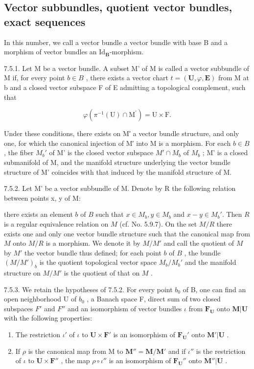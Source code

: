 \subsection{Vector subbundles, quotient vector bundles, exact sequences}

In this number, we call a vector bundle a vector bundle with base B and a morphism of vector bundles an \(\mathrm{Id}_{\mathbf{B}}\)-morphism.

7.5.1. Let M be a vector bundle. A subset M' of M is called a vector subbundle of M if, for every point \(b \in B\) , there exists a vector chart \(t = (\mathbf{U}, \varphi, \mathbf{E})\) from M at b and a closed vector subspace F of E admitting a topological complement, such that

\[
\varphi (\pi^ {- 1} (\mathrm{U}) \cap \mathrm{M} ^ {\prime}) = \mathrm{U} \times \mathrm{F}.
\]

Under these conditions, there exists on M′ a vector bundle structure, and only one, for which the canonical injection of M′ into M is a morphism. For each \(b \in B\) , the fiber \(M_{b}'\) of M' is the closed vector subspace \(M' \cap M_{b}\) of \(M_{b}\) ; M' is a closed submanifold of M, and the manifold structure underlying the vector bundle structure of M' coincides with that induced by the manifold structure of M.

7.5.2. Let M' be a vector subbundle of M. Denote by R the following relation between points x, y of M:

there exists an element \(b\) of \(B\) such that \(x \in M_b, y \in M_b\) and \(x - y \in M_b'\). Then \(R\) is a regular equivalence relation on \(M\) (cf. No. 5.9.7). On the set \(M/R\) there exists one and only one vector bundle structure such that the canonical map from \(M\) onto \(M/R\) is a morphism. We denote it by \(M/M'\) and call the quotient of \(M\) by \(M'\) the vector bundle thus defined; for each point \(b\) of \(B\) , the bundle \((M/M')_b\) is the quotient topological vector space \(M_b/M_b'\) and the manifold structure on \(M/M'\) is the quotient of that on \(M\) .

7.5.3. We retain the hypotheses of 7.5.2. For every point \(b_0\) of B, one can find an open neighborhood U of \(b_0\) , a Banach space F, direct sum of two closed subspaces \(F'\) and \(F''\) and an isomorphism of vector bundles \(\iota\) from \(\mathbf{F}_{\mathbf{U}}\) onto \(\mathbf{M}|\mathbf{U}\) with the following properties:

\begin{enumerate}
\def\labelenumi{(\roman{enumi})}
\item
  The restriction \(\iota'\) of \(\iota\) to \(\mathbf{U} \times \mathbf{F}'\) is an isomorphism of \(\mathbf{F}_{\mathbf{U}}'\) onto \(\mathbf{M}'|\mathbf{U}\) .
\item
  If \(\rho\) is the canonical map from M to \(\mathbf{M}'' = \mathbf{M} / \mathbf{M}'\) and if \(\iota''\) is the restriction of \(\iota\) to \(\mathbf{U} \times \mathbf{F}''\) , the map \(\rho \circ \iota''\) is an isomorphism of \(\mathbf{F}_{\mathbf{U}}''\) onto \(\mathbf{M}''|\mathbf{U}\) .
\end{enumerate}

